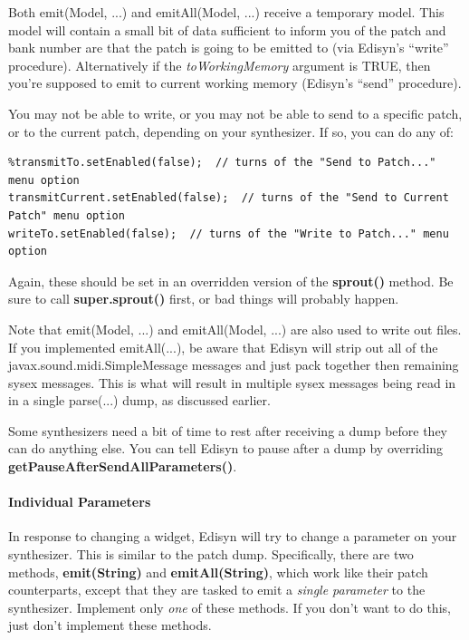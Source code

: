 \documentclass{article}
\begin{document}
Both emit(Model, ...) and emitAll(Model, ...) receive a temporary model.  This model will contain a small bit of data sufficient to inform you of the patch and bank number are that the patch is going to be emitted to (via Edisyn's ``write'' procedure).  Alternatively if the {\it toWorkingMemory} argument is TRUE, then you're supposed to emit to current working memory (Edisyn's ``send'' procedure).

You may not be able to write, or you may not be able to send to a specific patch, or to the current patch, depending on your synthesizer.  If so, you can do any of:

\begin{verbatim}
%transmitTo.setEnabled(false);  // turns of the "Send to Patch..." menu option
transmitCurrent.setEnabled(false);  // turns of the "Send to Current Patch" menu option
writeTo.setEnabled(false);  // turns of the "Write to Patch..." menu option
\end{verbatim}

Again, these should be set in an overridden version of the {\bf sprout()} method.  Be sure to call {\bf super.sprout()} first, or bad things will probably happen.

Note that emit(Model, ...) and emitAll(Model, ...) are also used to write out files.  If you implemented emitAll(...), be aware that Edisyn will strip out all of the javax.sound.midi.SimpleMessage messages and just pack together then remaining sysex messages.  This is what will result in multiple sysex messages being read in in a single parse(...) dump, as discussed earlier.  

Some synthesizers need a bit of time to rest after receiving a dump before they can do anything else.  You can tell Edisyn to pause after a dump by overriding {\bf getPauseAfterSendAllParameters()}.

\paragraph{Individual Parameters}

In response to changing a widget, Edisyn will try to change a parameter on your synthesizer.  This is similar to the patch dump.  Specifically, there are two methods, {\bf emit(String)} and {\bf emitAll(String)}, which work like their patch counterparts, except that they are tasked to emit a {\it single parameter} to the synthesizer.  Implement only {\it one} of these methods.  If you don't want to do this, just don't implement these methods.
\end{document}
